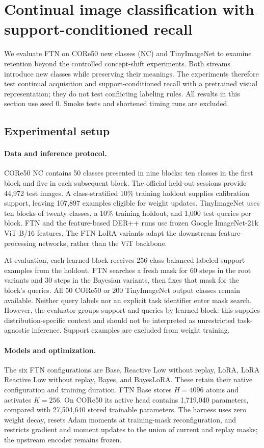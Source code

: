 \section{Continual image classification with support-conditioned recall}\label{sec:benchmarking}
We evaluate FTN on CORe50 new classes (NC) and TinyImageNet to examine retention beyond the controlled concept-shift experiments. Both streams introduce new classes while preserving their meanings. The experiments therefore test continual acquisition and support-conditioned recall with a pretrained visual representation; they do not test conflicting labeling rules. All results in this section use seed 0. Smoke tests and shortened timing runs are excluded.

\subsection{Experimental setup}
\paragraph{Data and inference protocol.}
CORe50 NC contains 50 classes presented in nine blocks: ten classes in the first block and five in each subsequent block. The official held-out sessions provide 44,972 test images. A class-stratified 10\% training holdout supplies calibration support, leaving 107,897 examples eligible for weight updates. TinyImageNet uses ten blocks of twenty classes, a 10\% training holdout, and 1,000 test queries per block. FTN and the feature-based DER++ runs use frozen Google ImageNet-21k ViT-B/16 features. The FTN LoRA variants adapt the downstream feature-processing networks, rather than the ViT backbone.

At evaluation, each learned block receives 256 class-balanced labeled support examples from the holdout. FTN searches a fresh mask for 60 steps in the root variants and 30 steps in the Bayesian variants, then fixes that mask for the block's queries. All 50 CORe50 or 200 TinyImageNet output classes remain available. Neither query labels nor an explicit task identifier enter mask search. However, the evaluator groups support and queries by learned block: this supplies distribution-specific context and should not be interpreted as unrestricted task-agnostic inference. Support examples are excluded from weight training.

\paragraph{Models and optimization.}
The six FTN configurations are Base, Reactive Low without replay, LoRA, LoRA Reactive Low without replay, Bayes, and BayesLoRA. These retain their native configuration and training duration. FTN Base stores $H=4096$ atoms and activates $K=256$. On CORe50 its active head contains 1,719,040 parameters, compared with 27,504,640 stored trainable parameters. The harness uses zero weight decay, resets Adam moments at training-mask reconfiguration, and restricts gradient and moment updates to the union of current and replay masks; the upstream encoder remains frozen.

